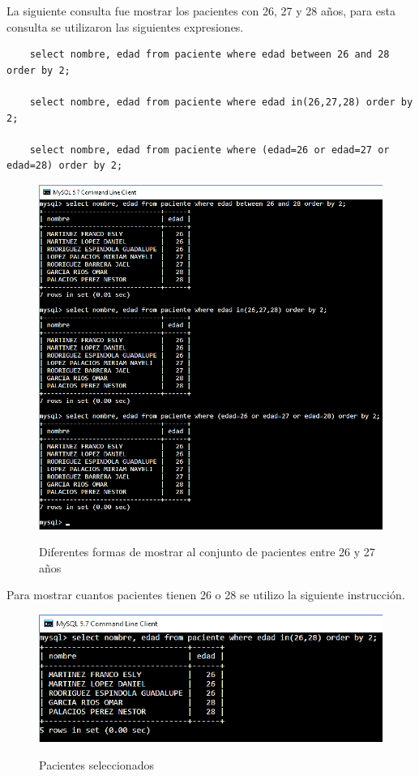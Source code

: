 \documentclass[12pt, titlepage]{article}
\begin{document}
	La siguiente consulta fue mostrar los pacientes con 26, 27 y 28 años, para esta consulta se utilizaron las siguientes expresiones.
	\begin{lstlisting}
	select nombre, edad from paciente where edad between 26 and 28 order by 2;
	
	select nombre, edad from paciente where edad in(26,27,28) order by 2;
	
	select nombre, edad from paciente where (edad=26 or edad=27 or edad=28) order by 2;
	\end{lstlisting}
	\begin{figure}[H]
		\begin{center}
			\includegraphics[width=\textwidth]{img/nueve.png}
			\label{fig:nueve}
			\caption{Diferentes formas de mostrar al conjunto de pacientes entre 26 y 27 años}
		\end{center}
	\end{figure}
	
	Para mostrar cuantos pacientes tienen 26 o 28 se utilizo la siguiente instrucción.
	\begin{figure}[H]
		\begin{center}
			\includegraphics[width=\textwidth]{img/diez.png}
			\label{fig:diez}
			\caption{Pacientes seleccionados}
		\end{center}
	\end{figure}
	
\end{document}
